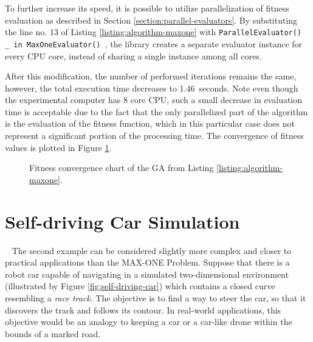 To further increase its speed, it is possible to utilize parallelization of fitness evaluation as described in Section \ref{section:parallel-evaluators}. By substituting the line no. 13 of Listing \ref{listing:algorithm-maxone} with \texttt{ParallelEvaluator() { _ in MaxOneEvaluator() }}, the library creates a separate evaluator instance for every CPU core, instead of sharing a single instance among all cores.

After this modification, the number of performed iterations remains the same, however, the total execution time decreases to 1.46~seconds. Note even though the experimental computer has 8 core CPU, such a small decrease in evaluation time is acceptable due to the fact that the only parallelized part of the algorithm is the evaluation of the fitness function, which in this particular case does not represent a significant portion of the processing time. The convergence of fitness values is plotted in Figure \ref{fig:maxone-fitness}.

\begin{figure}[ht]
	\centering
	\caption[MAX-ONE genetic algorithm fitness convergence chart.]{Fitness convergence chart of the GA from Listing \ref{listing:algorithm-maxone}.}
	\label{fig:maxone-fitness}
\end{figure}

\section{Self-driving Car Simulation}~\label{section:self-driving-car}
The second example can be considered slightly more complex and closer to practical applications than the MAX-ONE Problem. Suppose that there is a robot car capable of navigating in a simulated two-dimensional environment (illustrated by Figure \ref{fig:self-driving-car}) which contains a closed curve resembling a \textit{race track}. The objective is to find a way to steer the car, so that it discovers the track and follows its contour. In real-world applications, this objective would be an analogy to keeping a car or a car-like drone within the bounds of a marked road.

